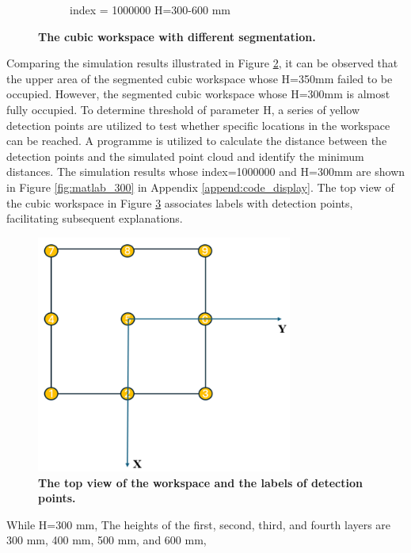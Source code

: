 \begin{figure}[H]
\begin{subfigure}{0.45\textwidth}
        \caption{\centering index = 1000000 H=300-600 mm}
        \label{fig:ws_10000_300}
    \end{subfigure}
    \caption[The cubic workspace with different segmentation]
    {\centering \textbf{The cubic workspace with different segmentation.}}
    \label{fig:ws_300_350}
\end{figure}
Comparing the simulation results illustrated in Figure \ref{fig:ws_300_350}, it can be observed that the upper 
area of the segmented cubic workspace whose H=350mm failed to be occupied. However, the segmented cubic workspace 
whose H=300mm is almost fully occupied. To determine threshold of parameter H, a series of yellow detection points 
are utilized to test whether specific locations in the workspace can be reached. A programme is utilized to calculate 
the distance between the detection points and the simulated point cloud and identify the minimum distances. The  
simulation results whose index=1000000 and H=300mm are shown in Figure \ref{fig:matlab_300} in Appendix 
\ref{append:code_display}. The top view of the cubic workspace in Figure \ref{fig:top_view} associates labels with 
detection points, facilitating subsequent explanations. 
\begin{figure}[H] %
    \centering 
    \captionsetup{labelsep=colon}
    \includegraphics[width=0.75\textwidth]{Image/Result/top_view_rect_workspace.png} 
    \caption[The top view of the workspace and the labels of detection points]
    {\centering \textbf{The top view of the workspace and the labels of detection points.}}
    \label{fig:top_view}
\end{figure}
While H=300 mm, The heights of the first, second, third, and fourth layers are 300 mm, 400 mm, 500 mm, and 600 mm, 
